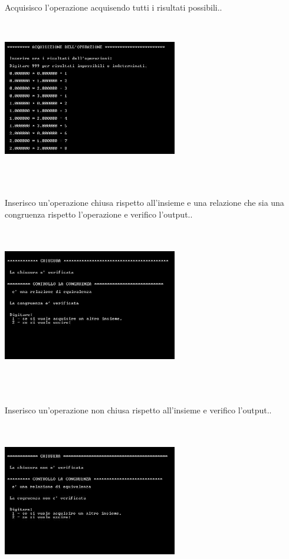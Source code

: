 \documentclass[11pt,a4paper,titlepage,block]{article}
\begin{document}
\\
Acquisisco l'operazione acquisendo tutti i risultati possibili..\\
\includegraphics[width=3in,height=3in,viewport=0 0 300 300]{../Screenshots/Capture4.JPG}\\
\\
\newpage
Inserisco un'operazione chiusa rispetto all'insieme e una relazione che sia una congruenza rispetto l'operazione e verifico l'output..\\
\includegraphics[width=3in,height=3in,viewport=0 0 300 300]{../Screenshots/Capture7.JPG}\\
\\
Inserisco un'operazione non chiusa rispetto all'insieme e verifico l'output..\\
\includegraphics[width=3in,height=3in,viewport=0 0 300 300]{../Screenshots/Capture8.JPG}\\
\end{document}
